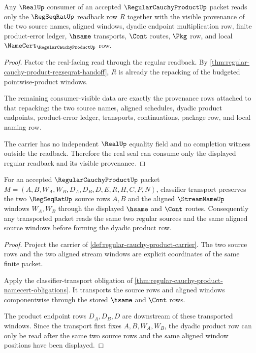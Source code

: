 \begin{theorem}
\label{thm:regular-cauchy-product-real-seal-boundary}
Any $\RealUp$ consumer of an accepted $\RegularCauchyProductUp$ packet reads only the $\RegSeqRatUp$ readback row $R$ together with the visible provenance of the two source names, aligned windows, dyadic endpoint multiplication row, finite product-error ledger, $\hsame$ transports, $\Cont$ routes, $\Pkg$ row, and local $\NameCert_{\RegularCauchyProductUp}$ row.
\end{theorem}
\begin{proof}
Factor the real-facing read through the regular readback. By \autoref{thm:regular-cauchy-product-regseqrat-handoff}, $R$ is already the repacking of the budgeted pointwise-product windows.

The remaining consumer-visible data are exactly the provenance rows attached to that repacking: the two source names, aligned schedules, dyadic product endpoints, product-error ledger, transports, continuations, package row, and local naming row.

The carrier has no independent $\RealUp$ equality field and no completion witness outside the readback. Therefore the real seal can consume only the displayed regular readback and its visible provenance.
\end{proof}

\begin{theorem}
\label{thm:regular-cauchy-product-source-window-transport}
For an accepted $\RegularCauchyProductUp$ packet $M=(A,B,W_A,W_B,D_A,D_B,D,E,R,H,C,P,N)$, classifier transport preserves the two $\RegSeqRatUp$ source rows $A,B$ and the aligned $\StreamNameUp$ windows $W_A,W_B$ through the displayed $\hsame$ and $\Cont$ routes. Consequently any transported packet reads the same two regular sources and the same aligned source windows before forming the dyadic product row.
\end{theorem}
\begin{proof}
Project the carrier of \autoref{def:regular-cauchy-product-carrier}. The two source rows and the two aligned stream windows are explicit coordinates of the same finite packet.

Apply the classifier-transport obligation of \autoref{thm:regular-cauchy-product-namecert-obligations}. It transports the source rows and aligned windows componentwise through the stored $\hsame$ and $\Cont$ rows.

The product endpoint rows $D_A,D_B,D$ are downstream of these transported windows. Since the transport first fixes $A,B,W_A,W_B$, the dyadic product row can only be read after the same two source rows and the same aligned window positions have been displayed.
\end{proof}


